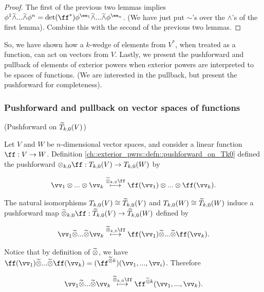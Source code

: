 \begin{proof}
   The first of the previous two lemmas implies $\phi^1 \twedge ... \twedge \phi^n = \det(\ff^*) \phi^{\ee_1} \twedge ... \twedge \phi^{\ee_n}$. (We have just put $\sim$'s over the $\wedge$'s of the first lemma). Combine this with the second of the previous two lemmas.
\end{proof}

So, we have shown how a $k$-wedge of elements from $V^*$, when treated as a function, can act on vectors from $V$. Lastly, we present the pushforward and pullback of elements of exterior powers when exterior powers are interpreted to be spaces of functions. (We are interested in the pullback, but present the pushforward for completeness).

\subsubsection{Pushforward and pullback on vector spaces of functions}

\begin{deriv}
    (Pushforward on $\widetilde{T}_{k,0}(V)$)
    
    Let $V$ and $W$ be $n$-dimensional vector spaces, and consider a linear function $\ff:V \rightarrow W$. Definition \ref{ch::exterior_pwrs::defn::pushforward_on_Tk0} defined the pushforward $\otimes_{k, 0} \ff: T_{k,0}(V) \rightarrow T_{k,0}(W)$ by
    
    \begin{align*}
        \vv_1 \otimes ... \otimes \vv_k \overset{\totimes_{k,0} \ff}{\longmapsto} \ff(\vv_1) \otimes ... \otimes \ff(\vv_k).
    \end{align*}
    
    The natural isomorphisms $T_{k,0}(V) \cong \widetilde{T}_{k,0}(V)$ and $T_{k,0}(W) \cong \widetilde{T}_{k,0}(W)$ induce a pushforward map $\totimes_{k,0} \ff:\tT_{k,0}(V) \rightarrow \tT_{k,0}(W)$ defined by
    
    \begin{align*}
        \vv_1 \totimes ... \totimes \vv_k \overset{\totimes_{k,0} \ff}{\longmapsto} \ff(\vv_1) \totimes ... \totimes \ff(\vv_k).
    \end{align*}
    
    Notice that by definition of $\widetilde{\otimes}$, we have $ \ff(\vv_1) \totimes ... \totimes \ff(\vv_k) = (\ff^{\totimes k})(\vv_1, ..., \vv_i)$. Therefore
    
    \begin{align*}
        \vv_1 \totimes ... \totimes \vv_k \overset{\totimes_{k,0} \ff}{\longmapsto} \ff^{\totimes k}(\vv_1, ..., \vv_k).
    \end{align*}
\end{deriv}

